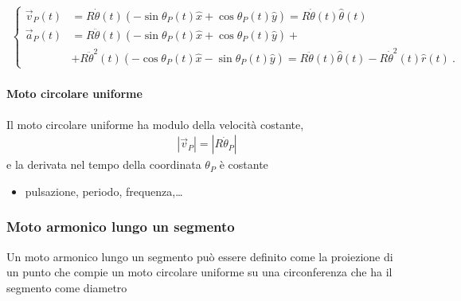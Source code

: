 \documentclass[letterpaper,10pt,italian]{jupyterBook}
\begin{document}
\begin{equation*}
\begin{split}\begin{cases}
  \vec{v}_P(t) & = R \dot{\theta}(t) \left( -\sin \theta_P(t) \hat{x} + \cos \theta_P(t) \hat{y} \right) = R \dot{\theta}(t) \hat{\theta}(t) \\
  \vec{a}_P(t) & = R \ddot{\theta}(t) \left( -\sin \theta_P(t) \hat{x} + \cos \theta_P(t) \hat{y} \right) + \\
               & + R \ddot{\theta}^2(t) \left( -\cos \theta_P(t) \hat{x} - \sin \theta_P(t) \hat{y} \right)     
                 = R \ddot{\theta}(t) \hat{\theta}(t) - R \dot{\theta}^2(t) \hat{r}(t) \ .
\end{cases}\end{split}
\end{equation*}

\paragraph{Moto circolare uniforme}
\label{\detokenize{ch/mechanics/kinematics-point:moto-circolare-uniforme}}\label{\detokenize{ch/mechanics/kinematics-point:physics-hs-mechanics-kinematics-point-motion-circular-uniform}}
\sphinxAtStartPar
Il moto circolare uniforme ha modulo della velocità costante,
\begin{equation*}
\begin{split}|\vec{v}_P| = |R \dot \theta_P|\end{split}
\end{equation*}
\sphinxAtStartPar
e la derivata nel tempo della coordinata \(\theta_P\) è costante 
\begin{itemize}
\item {} 
\sphinxAtStartPar
{} pulsazione, periodo, frequenza,…

\end{itemize}


\subsubsection{Moto armonico lungo un segmento}
\label{\detokenize{ch/mechanics/kinematics-point:moto-armonico-lungo-un-segmento}}\label{\detokenize{ch/mechanics/kinematics-point:physics-hs-mechanics-kinematics-point-motion-harmonic}}
\sphinxAtStartPar
Un moto armonico lungo un segmento può essere definito come la proiezione di un punto che compie un moto circolare uniforme su una circonferenza che ha il segmento come diametro 
\end{document}
